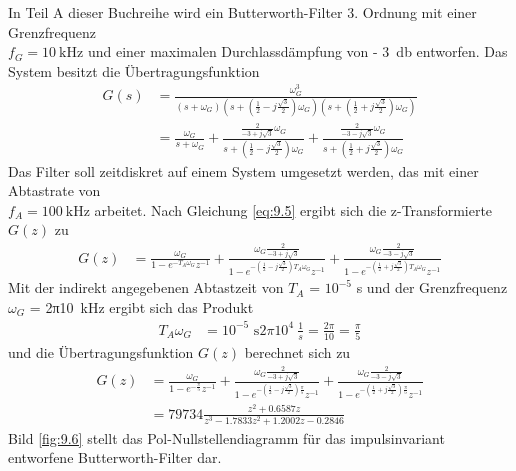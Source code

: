 In Teil A dieser Buchreihe wird ein Butterworth-Filter 3. Ordnung mit einer Grenzfrequenz\\
\(f_{G} = \qty{10}{\kilo\hertz}\) und einer maximalen Durchlassdämpfung von - \qty{3}{\decibel} entworfen. Das System besitzt die Übertragungsfunktion
\begin{align}
{G\left(s\right)} &=  {\frac{\omega _{G}^{3} }{\left(s+\omega _{G} \right) \left(s+\left(\frac{1}{2} -j \frac{\sqrt{3} }{2} \right) \omega _{G} \right) \left(s+\left(\frac{1}{2} +j \frac{\sqrt{3} }{2} \right) \omega _{G} \right)} } \\
{} &=  {\frac{\omega _{G} }{s+\omega _{G} } +\frac{\frac{2}{-3+j \sqrt{3} }  \omega _{G} }{s+\left(\frac{1}{2} -j \frac{\sqrt{3} }{2} \right) \omega _{G} } +\frac{\frac{2}{-3-j \sqrt{3} }  \omega _{G} }{s+\left(\frac{1}{2} +j \frac{\sqrt{3} }{2} \right) \omega _{G} } }
\label{eq:9.27}
\end{align}
Das Filter soll zeitdiskret auf einem System umgesetzt werden, das mit einer Abtastrate von\\
\(f_{A} = \qty{100}{\kilo\hertz}\) arbeitet. Nach Gleichung \eqref{eq:9.5} ergibt sich die z-Transformierte \(G(z)\) zu
\begin{align}
G(z) &= \frac{\omega_{G}}{1 - e^{- T_{A}  \omega_{G}}  z^{- 1}} + \frac{\omega_{G}  \frac{2}{- 3 + j  \sqrt{3}}}{1 - e^{- \left( \frac{1}{2} - j  \frac{\sqrt{3}}{2} \right)  T_{A}  \omega_{G}}  z^{- 1}} + \frac{\omega_{G}  \frac{2}{- 3 - j  \sqrt{3}}}{1 - e^{- \left( \frac{1}{2} + j  \frac{\sqrt{3}}{2} \right)  T_{A}  \omega_{G}}  z^{- 1}} \label{eq:9.28}
\end{align}
Mit der indirekt angegebenen Abtastzeit von \(T_{A}\) = \(10^{-5}\) s und der Grenzfrequenz \(ω_{G}\) = 2π\qty{10}{\kilo\hertz} ergibt sich das Produkt
\begin{align}
T_{A}  \omega_{G} &= 10^{- 5}\text{ s}  2  \pi  10^{4}\ \frac{1}{s} = \frac{2  \pi}{10} = \frac{\pi}{5} \label{eq:9.29}
\end{align}
und die Übertragungsfunktion \(G(z)\) berechnet sich zu
\begin{align}
{G\left(z\right)} &=  {\frac{\omega _{G} }{1-e^{-\frac{\pi }{5} }  z^{-1} } +\frac{\omega _{G}  \frac{2}{-3+j \sqrt{3} } }{1-e^{-\left(\frac{1}{2} -j \frac{\sqrt{3} }{2} \right) \frac{\pi }{5} }  z^{-1} } +\frac{\omega _{G}  \frac{2}{-3-j \sqrt{3} } }{1-e^{-\left(\frac{1}{2} +j \frac{\sqrt{3} }{2} \right) \frac{\pi }{5} }  z^{-1} } } \\
{} &=  {{79734} \frac{z^{2} +0.6587 z}{z^{3} -1.7833 z^{2} +1.2002 z-0.2846} }
\label{eq:9.30}
\end{align}
Bild \ref{fig:9.6} stellt das Pol-Nullstellendiagramm für das impulsinvariant entworfene Butterworth-Filter dar.

